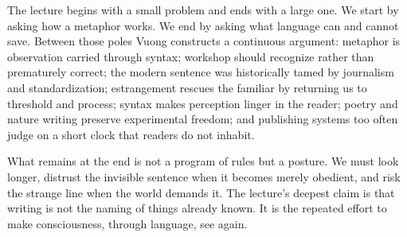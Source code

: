 The lecture begins with a small problem and ends with a large one. We start by asking how a metaphor works. We end by asking what language can and cannot save. Between those poles Vuong constructs a continuous argument: metaphor is observation carried through syntax; workshop should recognize rather than prematurely correct; the modern sentence was historically tamed by journalism and standardization; estrangement rescues the familiar by returning us to threshold and process; syntax makes perception linger in the reader; poetry and nature writing preserve experimental freedom; and publishing systems too often judge on a short clock that readers do not inhabit.

What remains at the end is not a program of rules but a posture. We must look longer, distrust the invisible sentence when it becomes merely obedient, and risk the strange line when the world demands it. The lecture's deepest claim is that writing is not the naming of things already known. It is the repeated effort to make consciousness, through language, see again.